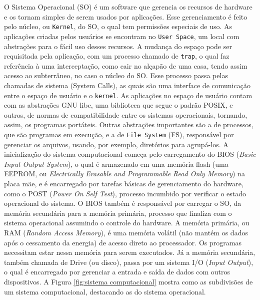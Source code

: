 O Sistema Operacional (SO) é um software que gerencia os recursos de
hardware e os tornam simples de serem usados por aplicações. Esse
gerenciamento é feito pelo núcleo, ou \texttt{Kernel}, do SO, o qual tem
permissões especiais de uso. As aplicações criadas pelos usuários se
encontram no \texttt{User Space}, um local com abstrações para o fácil uso desses
recursos. A mudança do espaço pode ser requisitada pela aplicação, com
um processo chamado de \texttt{trap}, o qual faz referência à uma
interceptação, como cair no alçapão de uma casa, tendo assim acesso ao
subterrâneo, no caso o núcleo do SO. Esse processo passa pelas chamadas
de sistema (System Calls), as quais são uma interface de comunicação
entre o espaço de usuário e o \texttt{kernel}. As aplicações no espaço de usuário
contam com as abstrações GNU libc, uma biblioteca que segue o padrão
POSIX, e outros, de normas de compatibilidade entre os sistemas
operacionais, tornando, assim, os programas portáteis. Outras abstrações
importantes são a de processos, que são programas em execução, e a de
\texttt{File System} (FS), responsável por gerenciar os arquivos, usando, por
exemplo, diretórios para agrupá-los. A inicialização do sistema
computacional começa pelo carregamento do BIOS (\emph{Basic Input Output
System}), o qual é armazenado em uma memória flash (uma EEPROM, ou
\emph{Electrically Erasable and Programmable Read Only Memory}) na placa
mãe, e é encarregado por tarefas básicas de gerenciamento do hardware,
como o POST (\emph{Power On Self Test}), processo incumbido por verificar
o estado operacional do sistema. O BIOS também é responsável por
carregar o SO, da memória secundária para a memória primária, processo
que finaliza com o sistema operacional assumindo o controle do hardware.
A memória primária, ou RAM (\emph{Random Access Memory}), é uma memória
volátil (não mantém os dados após o cessamento da energia) de acesso
direto ao processador. Os programas necessitam estar nessa memória para
serem executados. Já a memória secundária, também chamada de Drive (ou
disco), passa por um sistema I/O (\emph{Input Output}), o qual é
encarregado por gerenciar a entrada e saída de dados com outros
dispositivos. A Figura \ref{fig:sistema computacional} mostra como as subdivisões de um sistema
computacional, destacando as do sistema operacional.

